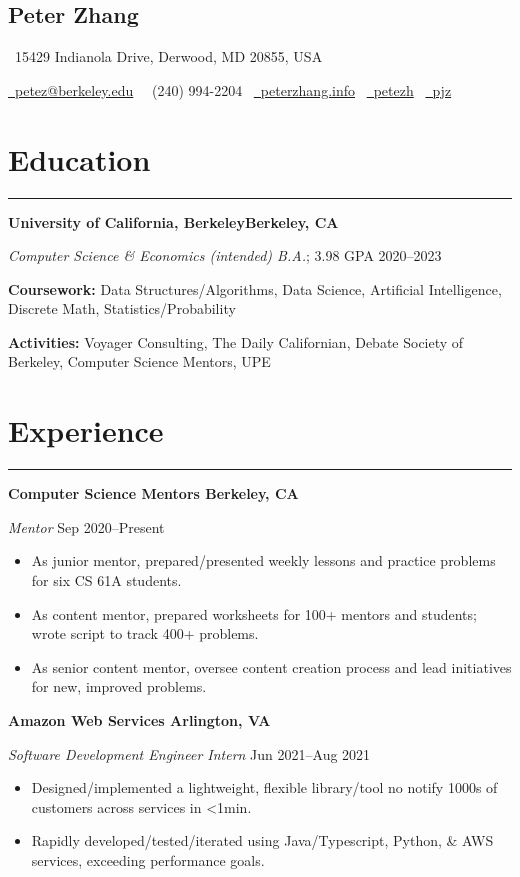 \documentclass[11pt]{article}
\newcommand{\name}[1]{\begin{center}\section*{\huge \color{highlight} #1}\vspace{-0.6cm}\end{center}}
\newcommand{\topinfo}[1]{\begin{center}\vspace{-0.2cm}#1\vspace{-0.2cm}\end{center}}
\newcommand{\resumesection}[1]{\vspace{-0.8cm}\section*{\color{highlight}#1}\vspace{-0.3cm}\hrule\vspace{0.2cm}}
\begin{document}
\name{Peter Zhang}
\topinfo{\faHome \ 15429 Indianola Drive, Derwood, MD 20855, USA}
\topinfo{\href{mailto:petez@berkeley.edu}{\faEnvelope \ petez@berkeley.edu} \ \faPhone \ (240) 994-2204 \ \href{https://peterzhang.info/}{\faBriefcase \ peterzhang.info} \  \href{https://github.com/petezh}{\faGithub \ petezh} \  \href{https://www.linkedin.com/in/pjz/}{\faLinkedinSquare \ pjz}}

\resumesection{Education}

\textbf{University of California, Berkeley\hfill Berkeley, CA} \par
\textit{Computer Science \& Economics (intended) B.A.}; 3.98 GPA \hfill 2020--2023\par
\textbf{Coursework:} Data Structures/Algorithms, Data Science, Artificial Intelligence, Discrete Math, Statistics/Probability\par
\textbf{Activities:} Voyager Consulting, The Daily Californian, Debate Society of Berkeley, Computer Science Mentors, UPE

\resumesection{Experience}

\textbf{Computer Science Mentors \hfill Berkeley, CA} \par
\textit{ Mentor} \hfill Sep 2020--Present \par
\begin{itemize}
	\item As junior mentor, prepared/presented weekly lessons and practice problems for six CS 61A students.
	\item As content mentor, prepared worksheets for 100+ mentors and students; wrote script to track 400+ problems.
	\item As senior content mentor, oversee content creation process and lead initiatives for new, improved problems.
\end{itemize}\vspace{0.1cm}

\textbf{Amazon Web Services \hfill Arlington, VA}\par
\textit{Software Development Engineer Intern} \hfill Jun 2021--Aug 2021
\begin{itemize}
	\item Designed/implemented a lightweight, flexible library/tool no notify 1000s of customers across services in <1min.
	\item Rapidly developed/tested/iterated using Java/Typescript, Python, \& AWS services, exceeding performance goals.
\end{itemize}\par
\end{document}

